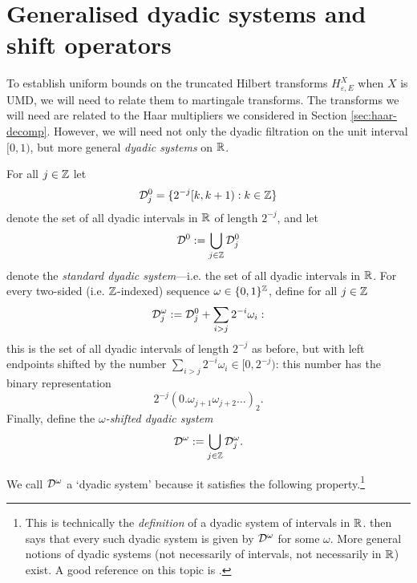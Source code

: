 \section{Generalised dyadic systems and shift operators}

To establish uniform bounds on the truncated Hilbert transforms $H_{\varepsilon, E}^{X}$ when $X$ is UMD, we will need to relate them to martingale transforms.
The transforms we will need are related to the Haar multipliers we considered in Section \ref{sec:haar-decomp}.
However, we will need not only the dyadic filtration on the unit interval $[0,1)$, but more general \emph{dyadic systems} on $\mathbb{R}$.

\begin{defn}
  For all $j \in \mathbb{Z}$ let
  \begin{equation*}
    \mathcal{D}_{j}^{0} = \{2^{-j}[k, k+1) : k \in \mathbb{Z}\}
  \end{equation*}
  denote the set of all dyadic intervals in $\mathbb{R}$ of length $2^{-j}$, and let
  \begin{equation*}
    \mathcal{D}^{0} := \bigcup_{j \in \mathbb{Z}} \mathcal{D}_{j}^{0}
  \end{equation*}
  denote the \emph{standard dyadic system}---i.e. the set of all dyadic intervals in $\mathbb{R}$.
  For every two-sided (i.e. $\mathbb{Z}$-indexed) sequence $\omega \in \{0,1\}^{\mathbb{Z}}$, define for all $j \in \mathbb{Z}$
  \begin{equation*}
    \mathcal{D}_{j}^{\omega} := \mathcal{D}_{j}^{0} + \sum_{i > j} 2^{-i} \omega_{i}:
  \end{equation*}
  this is the set of all dyadic intervals of length $2^{-j}$ as before, but with left endpoints shifted by the number $\sum_{i > j} 2^{-i} \omega_{i} \in [0,2^{-j})$: this number has the binary representation
  \begin{equation*}
    2^{-j}(0.\omega_{j+1}\omega_{j+2}\ldots)_{2} .
  \end{equation*}
  Finally, define the \emph{$\omega$-shifted dyadic system}
  \begin{equation*}
   \mathcal{D}^{\omega} := \bigcup_{j \in \mathbb{Z}} \mathcal{D}_{j}^{\omega}.
  \end{equation*}
\end{defn}

We call $\mathcal{D}^{\omega}$ a `dyadic system' because it satisfies the following property.\footnote{This is technically the \emph{definition} of a dyadic system of intervals in $\mathbb{R}$. \cite[Lemma 5.1.7]{HNVW16} then says that every such dyadic system is given by $\mathcal{D}^\omega$ for some $\omega$. More general notions of dyadic systems (not necessarily of intervals, not necessarily in $\mathbb{R}$) exist. A good reference on this topic is \cite{LN18}.}

